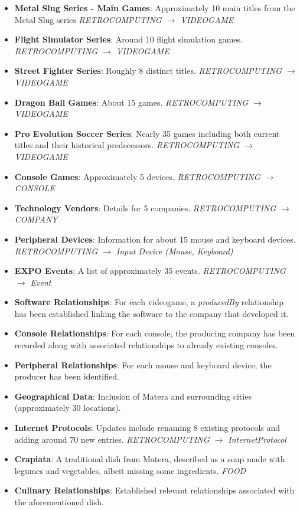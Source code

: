 \begin{itemize}
    \item \textbf{Metal Slug Series - Main Games}: Approximately 10 main titles from the Metal Slug series  \textit{RETROCOMPUTING $\rightarrow$ VIDEOGAME}
    \item \textbf{Flight Simulator Series}: Around 10 flight simulation games.  \textit{RETROCOMPUTING $\rightarrow$ VIDEOGAME}
    \item \textbf{Street Fighter Series}: Roughly 8 distinct titles.  \textit{RETROCOMPUTING $\rightarrow$ VIDEOGAME}
    \item \textbf{Dragon Ball Games}: About 15 games.  \textit{RETROCOMPUTING $\rightarrow$ VIDEOGAME}
    \item \textbf{Pro Evolution Soccer Series}: Nearly 35 games including both current titles and their historical predecessors.  \textit{RETROCOMPUTING $\rightarrow$ VIDEOGAME}
    \item \textbf{Console Games}: Approximately 5 devices.  \textit{RETROCOMPUTING $\rightarrow$ CONSOLE}
    \item \textbf{Technology Vendors}: Details for 5 companies.  \textit{RETROCOMPUTING $\rightarrow$ COMPANY}
    \item \textbf{Peripheral Devices}: Information for about 15 mouse and keyboard devices.  \textit{RETROCOMPUTING $\rightarrow$ Input Device   (Mouse, Keyboard)}
    \item \textbf{EXPO Events}: A list of approximately 35 events. \textit{RETROCOMPUTING $\rightarrow$ Event}
    \item \textbf{Software Relationships}: For each videogame, a \textit{producedBy} relationship has been established linking the software to the company that developed it.
    \item \textbf{Console Relationships}: For each console, the producing company has been recorded along with associated relationships to already existing consoles.
    \item \textbf{Peripheral Relationships}: For each mouse and keyboard device, the producer has been identified.
    \item \textbf{Geographical Data}: Inclusion of Matera and surrounding cities (approximately 30 locations).
    \item \textbf{Internet Protocols}: Updates include renaming 8 existing protocols and adding around 70 new entries.  \textit{RETROCOMPUTING $\rightarrow$ InternetProtocol}
    \item \textbf{Crapiata}: A traditional dish from Matera, described as a soup made with legumes and vegetables, albeit missing some ingredients.   \textit{FOOD}
    \item \textbf{Culinary Relationships}: Established relevant relationships associated with the aforementioned dish.
\end{itemize}



